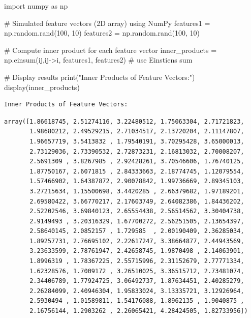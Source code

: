 \documentclass[
  letterpaper,
  DIV=11,
  numbers=noendperiod]{scrreprt}
\newenvironment{Shaded}{\begin{snugshade}}{\end{snugshade}}
\newcommand{\BuiltInTok}[1]{\textcolor[rgb]{0.00,0.23,0.31}{#1}}
\newcommand{\CommentTok}[1]{\textcolor[rgb]{0.37,0.37,0.37}{#1}}
\newcommand{\DecValTok}[1]{\textcolor[rgb]{0.68,0.00,0.00}{#1}}
\newcommand{\ImportTok}[1]{\textcolor[rgb]{0.00,0.46,0.62}{#1}}
\newcommand{\NormalTok}[1]{\textcolor[rgb]{0.00,0.23,0.31}{#1}}
\newcommand{\OperatorTok}[1]{\textcolor[rgb]{0.37,0.37,0.37}{#1}}
\newcommand{\StringTok}[1]{\textcolor[rgb]{0.13,0.47,0.30}{#1}}
\theoremstyle{plain}
\theoremstyle{definition}
\theoremstyle{remark}
\begin{document}
\begin{Shaded}
\begin{Highlighting}[]
\ImportTok{import}\NormalTok{ numpy }\ImportTok{as}\NormalTok{ np}

\CommentTok{\# Simulated feature vectors (2D array) using NumPy}
\NormalTok{features1 }\OperatorTok{=}\NormalTok{ np.random.rand(}\DecValTok{100}\NormalTok{, }\DecValTok{10}\NormalTok{)}
\NormalTok{features2 }\OperatorTok{=}\NormalTok{ np.random.rand(}\DecValTok{100}\NormalTok{, }\DecValTok{10}\NormalTok{)}

\CommentTok{\# Compute inner product for each feature vector}
\NormalTok{inner\_products }\OperatorTok{=}\NormalTok{ np.einsum(}\StringTok{\textquotesingle{}ij,ij{-}\textgreater{}i\textquotesingle{}}\NormalTok{, features1, features2) }\CommentTok{\# use Einstien\textquotesingle{}s sum}

\CommentTok{\# Display results}
\BuiltInTok{print}\NormalTok{(}\StringTok{"Inner Products of Feature Vectors:"}\NormalTok{)}
\NormalTok{display(inner\_products)}
\end{Highlighting}
\end{Shaded}

\begin{verbatim}
Inner Products of Feature Vectors:
\end{verbatim}

\begin{verbatim}
array([1.86618745, 2.51274116, 3.22480512, 1.75063304, 2.71721823,
       1.98680212, 2.49529215, 2.71034517, 2.13720204, 2.11147807,
       1.96657719, 3.5413832 , 1.79540191, 3.70295428, 3.65000013,
       2.73129036, 2.73390532, 2.72873231, 2.16813032, 2.70008207,
       2.5691309 , 3.8267985 , 2.92428261, 3.70546606, 1.76740125,
       1.87750167, 2.6071815 , 2.84333663, 2.18774745, 1.12079554,
       1.57466902, 1.64387872, 2.90078842, 1.99736669, 2.89345103,
       3.27215634, 1.15500698, 3.4420285 , 2.66379682, 1.97189201,
       2.69580422, 3.66770217, 2.17603749, 2.64082386, 1.84436202,
       2.52202546, 3.69840123, 2.65554438, 2.56514562, 3.30404738,
       2.9149493 , 3.20316329, 1.67700272, 2.56251505, 2.13654397,
       2.58640145, 2.0852157 , 1.729585  , 2.00190409, 2.36285034,
       1.89257731, 2.76695102, 2.22617247, 3.38664877, 2.44943569,
       3.23633599, 2.78761947, 2.42658745, 1.9870498 , 2.14063901,
       1.8996319 , 1.78367225, 2.55715996, 2.31152679, 2.77771334,
       1.62328576, 1.7009172 , 3.26510025, 3.36515712, 2.73481074,
       2.34406789, 1.77924725, 3.06492737, 1.87634451, 2.40285279,
       2.26284099, 2.40946304, 1.95833024, 3.13335721, 3.12926964,
       2.5930494 , 1.01589811, 1.54176088, 1.8962135 , 1.9040875 ,
       2.16756144, 1.2903262 , 2.26065421, 4.28424505, 1.82733956])
\end{verbatim}
\end{document}
